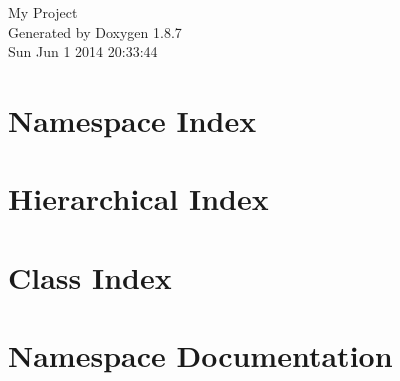 \documentclass[twoside]{book}
\newcommand{\+}{\discretionary{\mbox{\scriptsize$\hookleftarrow$}}{}{}}
\newcommand{\clearemptydoublepage}{%
  \newpage{\pagestyle{empty}\cleardoublepage}%
}
\begin{document}
\hypersetup{pageanchor=false,
             bookmarks=true,
             bookmarksnumbered=true,
             pdfencoding=unicode
            }
\begin{titlepage}
\vspace*{7cm}
\begin{center}%
{\Large My Project }\\
\vspace*{1cm}
{\large Generated by Doxygen 1.8.7}\\
\vspace*{0.5cm}
{\small Sun Jun 1 2014 20:33:44}\\
\end{center}
\end{titlepage}
\clearemptydoublepage
\tableofcontents
\clearemptydoublepage
{}
\hypersetup{pageanchor=true}

\chapter{Namespace Index}

\chapter{Hierarchical Index}

\chapter{Class Index}

\chapter{Namespace Documentation}



\end{document}
